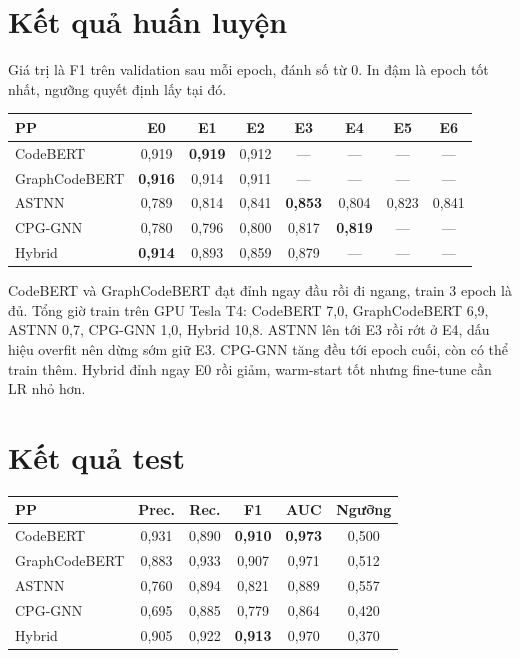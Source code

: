 \documentclass[11pt,a4paper]{article}
\begin{document}
\section{Kết quả huấn luyện}
Giá trị là F1 trên validation sau mỗi epoch, đánh số từ 0.
In đậm là epoch tốt nhất, ngưỡng quyết định lấy tại đó.
{\small
\begin{tabular*}{\textwidth}{@{\extracolsep{\fill}}lccccccc@{}}
\toprule
\textbf{PP} & \textbf{E0} & \textbf{E1} & \textbf{E2} & \textbf{E3} &
\textbf{E4} & \textbf{E5} & \textbf{E6} \\
\midrule
CodeBERT & 0,919 & \textbf{0,919} & 0,912 & --- & --- & --- & --- \\
GraphCodeBERT & \textbf{0,916} & 0,914 & 0,911 & --- & --- & --- & --- \\
ASTNN & 0,789 & 0,814 & 0,841 & \textbf{0,853} & 0,804 & 0,823 & 0,841 \\
CPG-GNN & 0,780 & 0,796 & 0,800 & 0,817 & \textbf{0,819} & --- & --- \\
Hybrid & \textbf{0,914} & 0,893 & 0,859 & 0,879 & --- & --- & --- \\
\bottomrule
\end{tabular*}\par}
CodeBERT và GraphCodeBERT đạt đỉnh ngay đầu rồi đi ngang, train 3 epoch là đủ.
Tổng giờ train trên GPU Tesla T4: CodeBERT 7,0, GraphCodeBERT 6,9,
ASTNN 0,7, CPG-GNN 1,0, Hybrid 10,8.
ASTNN lên tới E3 rồi rớt ở E4, dấu hiệu overfit nên dừng sớm giữ E3.
CPG-GNN tăng đều tới epoch cuối, còn có thể train thêm.
Hybrid đỉnh ngay E0 rồi giảm, warm-start tốt nhưng fine-tune cần LR nhỏ hơn.

\section{Kết quả test}
{\small
\begin{tabular*}{\textwidth}{@{\extracolsep{\fill}}lccccc@{}}
\toprule
\textbf{PP} & \textbf{Prec.} & \textbf{Rec.} & \textbf{F1} & \textbf{AUC} & \textbf{Ngưỡng} \\
\midrule
CodeBERT      & 0,931 & 0,890 & \textbf{0,910} & \textbf{0,973} & 0,500 \\
GraphCodeBERT & 0,883 & 0,933 & 0,907 & 0,971 & 0,512 \\
ASTNN         & 0,760 & 0,894 & 0,821 & 0,889 & 0,557 \\
CPG-GNN       & 0,695 & 0,885 & 0,779 & 0,864 & 0,420 \\
Hybrid        & 0,905 & 0,922 & \textbf{0,913} & 0,970 & 0,370 \\
\bottomrule
\end{tabular*}\par}
\end{document}
